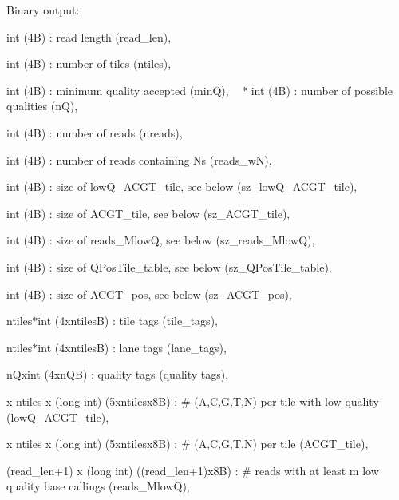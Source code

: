 \begin{DoxyItemize}
\item Binary output\+:
\begin{DoxyItemize}
\item {\ttfamily int} (4B) \+: read length ({\ttfamily read\+\_\+len}),
\item {\ttfamily int} (4B) \+: number of tiles ({\ttfamily ntiles}),
\item {\ttfamily int} (4B) \+: minimum quality accepted ({\ttfamily minQ}), ~\newline
 $\ast$ {\ttfamily int} (4B) \+: number of possible qualities ({\ttfamily nQ}),
\item {\ttfamily int} (4B) \+: number of reads ({\ttfamily nreads}),
\item {\ttfamily int} (4B) \+: number of reads containing N\textquotesingle{}s ({\ttfamily reads\+\_\+wN}),
\item {\ttfamily int} (4B) \+: size of {\ttfamily low\+Q\+\_\+\+A\+C\+G\+T\+\_\+tile}, see below ({\ttfamily sz\+\_\+low\+Q\+\_\+\+A\+C\+G\+T\+\_\+tile}),
\item {\ttfamily int} (4B) \+: size of {\ttfamily A\+C\+G\+T\+\_\+tile}, see below ({\ttfamily sz\+\_\+\+A\+C\+G\+T\+\_\+tile}),
\item {\ttfamily int} (4B) \+: size of {\ttfamily reads\+\_\+\+MlowQ}, see below ({\ttfamily sz\+\_\+reads\+\_\+\+MlowQ}),
\item {\ttfamily int} (4B) \+: size of {\ttfamily Q\+Pos\+Tile\+\_\+table}, see below ({\ttfamily sz\+\_\+\+Q\+Pos\+Tile\+\_\+table}),
\item {\ttfamily int} (4B) \+: size of {\ttfamily A\+C\+G\+T\+\_\+pos}, see below ({\ttfamily sz\+\_\+\+A\+C\+G\+T\+\_\+pos}),
\item {\ttfamily ntiles$\ast$int} (4x{\ttfamily ntiles}B) \+: tile tags ({\ttfamily tile\+\_\+tags}),
\item {\ttfamily ntiles$\ast$int} (4x{\ttfamily ntiles}B) \+: lane tags ({\ttfamily lane\+\_\+tags}),
\item {\ttfamily n\+Qxint} (4x{\ttfamily nQ}B) \+: quality tags ({\ttfamily quality tags}),
\item { x ntiles x (long int)} (5x{\ttfamily ntiles}x8B) \+: \# (A,C,G,T,N) per tile with low quality ({\ttfamily low\+Q\+\_\+\+A\+C\+G\+T\+\_\+tile}),
\item { x ntiles x (long int)} (5x{\ttfamily ntiles}x8B) \+: \# (A,C,G,T,N) per tile ({\ttfamily A\+C\+G\+T\+\_\+tile}),
\item {\ttfamily (read\+\_\+len+1) x (long int)} (({\ttfamily read\+\_\+len}+1)x8B) \+: \# reads with at least {\ttfamily m} low quality base callings ({\ttfamily reads\+\_\+\+MlowQ}),

\end{DoxyItemize}
\end{DoxyItemize}
